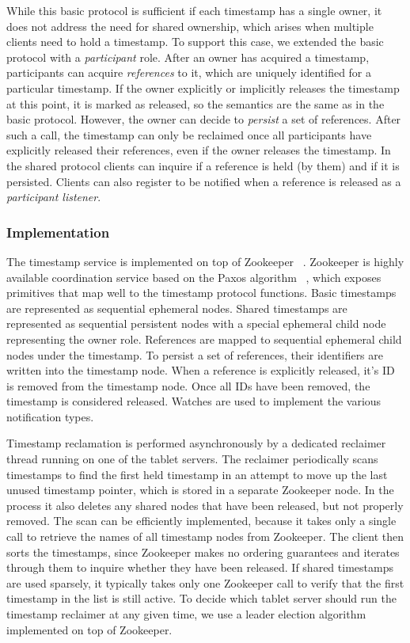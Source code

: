 \documentclass[10pt,final,journal]{IEEEtran}
\begin{document}
While this basic protocol is sufficient if each timestamp has a single owner, it does not address the need for shared ownership, which arises when multiple clients need to hold a timestamp. To support this case, we extended the basic protocol with a \emph{participant} role. After an owner has acquired a timestamp, participants can acquire \emph{references} to it, which are uniquely identified for a particular timestamp. If the owner explicitly or implicitly releases the timestamp at this point, it is marked as released, so the semantics are the same as in the basic protocol. However, the owner can decide to \emph{persist} a set of references. After such a call, the timestamp can only be reclaimed once all participants have explicitly released their references, even if the owner releases the timestamp. In the shared protocol clients can inquire if a reference is held (by them) and if it is persisted. Clients can also register to be notified when a reference is released as a \emph{participant listener}.

\subsubsection{Implementation}
The timestamp service is implemented on top of Zookeeper ~\cite{Hunt:2010:ZWC:1855840.1855851}. Zookeeper is highly available coordination service based on the Paxos algorithm ~\cite{Lamport:1998:PP:279227.279229, Lamport:2001:PMS}, which exposes primitives that map well to the timestamp protocol functions. Basic timestamps are represented as sequential ephemeral nodes. Shared timestamps are represented as sequential persistent nodes with a special ephemeral child node representing the owner role. References are mapped to sequential ephemeral child nodes under the timestamp. To persist a set of references, their identifiers are written into the timestamp node. When a reference is explicitly released, it's ID is removed from the timestamp node. Once all IDs have been removed, the timestamp is considered released. Watches are used to implement the various notification types.

Timestamp reclamation is performed asynchronously by a dedicated reclaimer thread running on one of the tablet servers. The reclaimer periodically scans timestamps to find the first held timestamp in an attempt to move up the last unused timestamp pointer, which is stored in a separate Zookeeper node. In the process it also deletes any shared nodes that have been released, but not properly removed. The scan can be efficiently implemented, because it takes only a single call to retrieve the names of all timestamp nodes from Zookeeper. The client then sorts the timestamps, since Zookeeper makes no ordering guarantees and iterates through them to inquire whether they have been released. If shared timestamps are used sparsely, it typically takes only one Zookeeper call to verify that the first timestamp in the list is still active. To decide which tablet server should run the timestamp reclaimer at any given time, we use a leader election algorithm implemented on top of Zookeeper.
\end{document}
